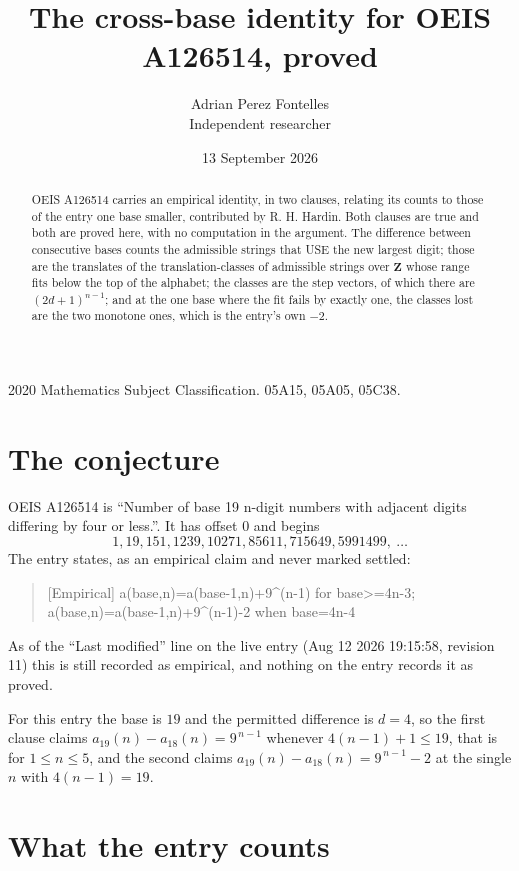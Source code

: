 \documentclass[11pt,a4paper]{article}
\title{The cross-base identity for OEIS A126514, proved}
\author{Adrian Perez Fontelles\\ \small Independent researcher}
\date{13 September 2026}
\theoremstyle{plain}
\theoremstyle{definition}
\begin{document}
\maketitle

\begin{abstract}
OEIS A126514 carries an empirical identity, in two clauses, relating its counts to those of the
entry one base smaller, contributed by R. H. Hardin. Both clauses are true and both are proved
here, with no computation in the argument. The difference between consecutive bases counts the
admissible strings that USE the new largest digit; those are the translates of the
translation-classes of admissible strings over $\mathbf{Z}$ whose range fits below the top of
the alphabet; the classes are the step vectors, of which there are $(2d+1)^{n-1}$; and at the
one base where the fit fails by exactly one, the classes lost are the two monotone ones, which
is the entry's own $-2$.
\end{abstract}

\noindent\small 2020 Mathematics Subject Classification. 05A15, 05A05, 05C38.\normalsize

\section{The conjecture}

OEIS A126514 is ``Number of base 19 n-digit numbers with adjacent digits differing by four or less.''. It has offset $0$ and begins
\[
1, 19, 151, 1239, 10271, 85611, 715649, 5991499,\ \dots
\]
The entry states, as an empirical claim and never marked settled:
\begin{quote}
[Empirical] a(base,n)=a(base-1,n)+9\textasciicircum{}(n-1) for base>=4n-3; a(base,n)=a(base-1,n)+9\textasciicircum{}(n-1)-2 when base=4n-4
\end{quote}
As of the ``Last modified'' line on the live entry (Aug 12 2026 19:15:58, revision 11)
this is still recorded as empirical, and nothing on the entry records it as proved.

For this entry the base is $19$ and the permitted difference is $d=4$, so the first clause
claims $a_{19}(n)-a_{18}(n)=9^{\,n-1}$ whenever $4(n-1)+1\le19$, that is for
$1\le n\le5$, and the second claims $a_{19}(n)-a_{18}(n)=9^{\,n-1}-2$ at the single
$n$ with $4(n-1)=19$.

\section{What the entry counts}
\end{document}
